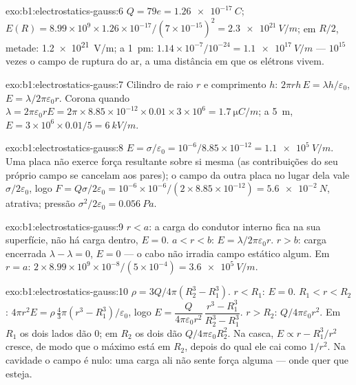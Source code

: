 \begin{solution}{exo:b1:electrostatics-gauss:6}
$Q = 79e = \qty{1.26e-17}{C}$; $E(R) = 8.99 \times 10^9 \times 1.26 \times 10^{-17}/
(7 \times 10^{-15})^2 = \qty{2.3e21}{V/m}$; em $R/2$, metade: \qty{1.2e21}{V/m}; a
\qty{1}{pm}: $1.14 \times 10^{-7}/10^{-24} = \qty{1.1e17}{V/m}$ --- $10^{15}$ vezes
o campo de ruptura do ar, a uma distância em que os elétrons vivem.
\end{solution}

\begin{solution}{exo:b1:electrostatics-gauss:7}
Cilindro de raio $r$ e comprimento $h$: $2\pi rh\,E = \lambda h/\varepsilon_0$, $E =
\lambda/2\pi\varepsilon_0r$. Corona quando $\lambda = 2\pi\varepsilon_0 rE = 2\pi \times 8.85 \times
10^{-12} \times 0.01 \times 3 \times 10^6 = \qty{1.7}{\micro C/m}$; a \qty{5}{m},
$E = 3 \times 10^6 \times 0.01/5 = \qty{6}{kV/m}$.
\end{solution}

\begin{solution}{exo:b1:electrostatics-gauss:8}
$E = \sigma/\varepsilon_0 = 10^{-6}/8.85 \times 10^{-12} = \qty{1.1e5}{V/m}$. Uma placa
não exerce força resultante sobre si mesma (as contribuições do seu próprio campo se cancelam
aos pares); o campo da outra placa no lugar dela vale $\sigma/2\varepsilon_0$, logo
$F = Q\sigma/2\varepsilon_0 = 10^{-6} \times 10^{-6}/(2 \times 8.85 \times 10^{-12}) =
\qty{5.6e-2}{N}$, atrativa; pressão $\sigma^2/2\varepsilon_0 = \qty{0.056}{Pa}$.
\end{solution}

\begin{solution}{exo:b1:electrostatics-gauss:9}
$r < a$: a carga do condutor interno fica na sua superfície, não há carga
dentro, $E = 0$. $a < r < b$: $E = \lambda/2\pi\varepsilon_0r$. $r > b$: carga
encerrada $\lambda - \lambda = 0$, $E = 0$ --- o cabo não irradia campo
estático algum. Em $r = a$: $2 \times 8.99 \times 10^9 \times 10^{-8}/(5 \times 10^{-4}) =
\qty{3.6e5}{V/m}$.
\end{solution}

\begin{solution}{exo:b1:electrostatics-gauss:10}
$\rho = 3Q/4\pi(R_2^3 - R_1^3)$. $r < R_1$: $E = 0$. $R_1 < r < R_2$: $4\pi r^2E =
\rho\,\tfrac43\pi(r^3 - R_1^3)/\varepsilon_0$, logo $E = \dfrac{Q}{4\pi\varepsilon_0r^2}\,
\dfrac{r^3 - R_1^3}{R_2^3 - R_1^3}$. $r > R_2$: $Q/4\pi\varepsilon_0r^2$. Em $R_1$ os dois
lados dão $0$; em $R_2$ os dois dão $Q/4\pi\varepsilon_0R_2^2$. Na casca, $E
\propto r - R_1^3/r^2$ cresce, de modo que o máximo está em $R_2$, depois do
qual ele cai como $1/r^2$. Na cavidade o campo é nulo: uma carga
ali não sente força alguma --- onde quer que esteja.
\end{solution}

